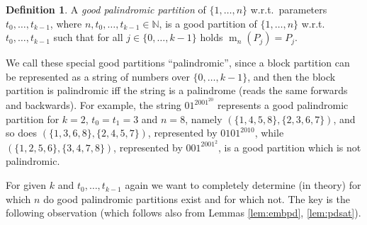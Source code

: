 \documentclass[final,3p,times]{elsarticle}
\theoremstyle{definition}
\newtheorem{defn}{Definition}[section]
\newcommand{\set}[1]{\{#1\}}
\newcommand{\NN}{\mathbb{N}}
\DeclareMathOperator{\mir}{m}
\begin{document}
\begin{defn}\label{def:goodpp}
  A \emph{good palindromic partition} of $\set{1,\dots,n}$ w.r.t.\ parameters $t_0,\dots,t_{k-1}$, where $n, t_0, \dots, t_{k-1} \in \NN$, is a good partition of $\set{1,\dots,n}$ w.r.t.\ $t_0,\dots,t_{k-1}$ such that for all $j \in \set{0,\dots,k-1}$ holds $\mir_n(P_j) = P_j$.
\end{defn}
We call these special good partitions ``palindromic'', since a block partition can be represented as a string of numbers over $\set{0, \dots, k-1}$, and then the block partition is palindromic iff the string is a palindrome (reads the same forwards and backwards). For example, the string $01^2001^20$ represents a good palindromic partition for $k=2$, $t_0=t_1=3$ and $n=8$, namely $(\set{1,4,5,8},\set{2,3,6,7})$, and so does $(\set{1,3,6,8},\set{2,4,5,7})$, represented by $0101^2010$, while $(\set{1,2,5,6},\set{3,4,7,8})$, represented by $001^2001^2$, is a good partition which is not palindromic.

For given $k$ and $t_0, \dots, t_{k-1}$ again we want to completely determine (in theory) for which $n$ do good palindromic partitions exist and for which not. The key is the following observation (which follows also from Lemmas \ref{lem:embpd}, \ref{lem:pdsat}).
\end{document}
